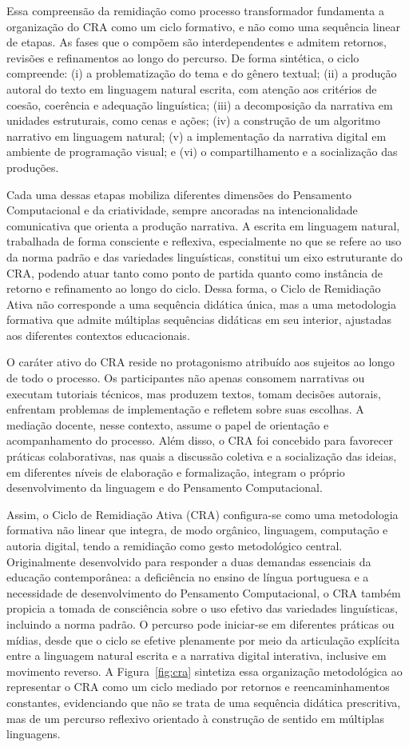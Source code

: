 \documentclass[portuguese]{textolivre}
\begin{document}
Essa compreensão da remidiação como processo transformador fundamenta a organização do CRA como um ciclo formativo, e não como uma sequência linear de etapas. As fases que o compõem são interdependentes e admitem retornos, revisões e refinamentos ao longo do percurso. De forma sintética, o ciclo compreende: (i) a problematização do tema e do gênero textual; (ii) a produção autoral do texto em linguagem natural escrita, com atenção aos critérios de coesão, coerência e adequação linguística; (iii) a decomposição da narrativa em unidades estruturais, como cenas e ações; (iv) a construção de um algoritmo narrativo em linguagem natural; (v) a implementação da narrativa digital em ambiente de programação visual; e (vi) o compartilhamento e a socialização das produções.

Cada uma dessas etapas mobiliza diferentes dimensões do Pensamento Computacional e da criatividade, sempre ancoradas na intencionalidade comunicativa que orienta a produção narrativa. A escrita em linguagem natural, trabalhada de forma consciente e reflexiva, especialmente no que se refere ao uso da norma padrão e das variedades linguísticas, constitui um eixo estruturante do CRA, podendo atuar tanto como ponto de partida quanto como instância de retorno e refinamento ao longo do ciclo. Dessa forma, o Ciclo de Remidiação Ativa não corresponde a uma sequência didática única, mas a uma metodologia formativa que admite múltiplas sequências didáticas em seu interior, ajustadas aos diferentes contextos educacionais.

O caráter ativo do CRA reside no protagonismo atribuído aos sujeitos ao longo de todo o processo. Os participantes não apenas consomem narrativas ou executam tutoriais técnicos, mas produzem textos, tomam decisões autorais, enfrentam problemas de implementação e refletem sobre suas escolhas. A mediação docente, nesse contexto, assume o papel de orientação e acompanhamento do processo. Além disso, o CRA foi concebido para favorecer práticas colaborativas, nas quais a discussão coletiva e a socialização das ideias, em diferentes níveis de elaboração e formalização, integram o próprio desenvolvimento da linguagem e do Pensamento Computacional.

Assim, o Ciclo de Remidiação Ativa (CRA) configura-se como uma metodologia formativa não linear que integra, de modo orgânico, linguagem, computação e autoria digital, tendo a remidiação como gesto metodológico central. Originalmente desenvolvido para responder a duas demandas essenciais da educação contemporânea: a deficiência no ensino de língua portuguesa e a necessidade de desenvolvimento do Pensamento Computacional, o CRA também propicia a tomada de consciência sobre o uso efetivo das variedades linguísticas, incluindo a norma padrão. O percurso pode iniciar-se em diferentes práticas ou mídias, desde que o ciclo se efetive plenamente por meio da articulação explícita entre a linguagem natural escrita e a narrativa digital interativa, inclusive em movimento reverso. A Figura~\ref{fig:cra} sintetiza essa organização metodológica ao representar o CRA como um ciclo mediado por retornos e reencaminhamentos constantes, evidenciando que não se trata de uma sequência didática prescritiva, mas de um percurso reflexivo orientado à construção de sentido em múltiplas linguagens.
\end{document}
